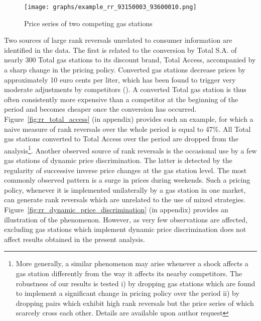 \documentclass[english]{article}
\begin{document}
\begin{figure}[htb!]
    \caption{Price series of two competing gas stations}
	\centering
		\texttt{[image: graphs/example\_rr\_93150003\_93600010.png]}
\label{fig:rr_pair_example}
\end{figure}

Two sources of large rank reversals unrelated to consumer information are identified in the data. The first is related to the conversion by Total S.A. of nearly 300 Total gas stations to its discount brand, Total Access, accompanied by a sharp change in the pricing policy. Converted gas stations decrease prices by approximately 10 euro cents per liter, which has been found to trigger very moderate adjustments by competitors (\cite{CHA16}). A converted Total gas station is thus often consistently more expensive than a competitor at the beginning of the period and becomes cheaper once the conversion has occurred. Figure~\ref{fig:rr_total_access} (in appendix) provides such an example, for which a naive measure of rank reversals over the whole period is equal to 47\%. All Total gas stations converted to Total Access over the period are dropped from the analysis\footnote{More generally, a similar phenomenon may arise whenever a shock affects a gas station differently from the way it affects its nearby competitors. The robustness of our results is tested i) by dropping gas stations which are found to implement a significant change in pricing policy over the period ii) by dropping pairs which exhibit high rank reversals but the price series of which scarcely cross each other. Details are available upon author request}. Another observed source of rank reversals is the occasional use by a few gas stations of dynamic price discrimination. The latter is detected by the regularity of successive inverse price changes at the gas station level. The most commonly observed pattern is a surge in prices during weekends. Such a pricing policy, whenever it is implemented unilaterally by a gas station in one market, can generate rank reversals which are unrelated to the use of mixed strategies. Figure~\ref{fig:rr_dynamic_price_discrimination} (in appendix) provides an illustration of the phenomenon. However, as very few observations are affected, excluding gas stations which implement dynamic price discrimination does not affect results obtained in the present analysis.
\end{document}
